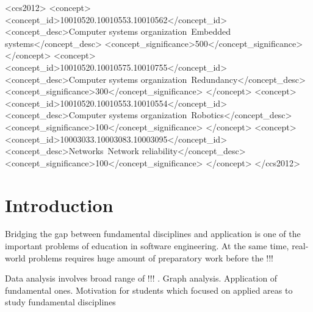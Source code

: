 \documentclass[sigconf]{acmart}
\begin{document}
\begin{CCSXML}
<ccs2012>
 <concept>
  <concept_id>10010520.10010553.10010562</concept_id>
  <concept_desc>Computer systems organization~Embedded systems</concept_desc>
  <concept_significance>500</concept_significance>
 </concept>
 <concept>
  <concept_id>10010520.10010575.10010755</concept_id>
  <concept_desc>Computer systems organization~Redundancy</concept_desc>
  <concept_significance>300</concept_significance>
 </concept>
 <concept>
  <concept_id>10010520.10010553.10010554</concept_id>
  <concept_desc>Computer systems organization~Robotics</concept_desc>
  <concept_significance>100</concept_significance>
 </concept>
 <concept>
  <concept_id>10003033.10003083.10003095</concept_id>
  <concept_desc>Networks~Network reliability</concept_desc>
  <concept_significance>100</concept_significance>
 </concept>
</ccs2012>
\end{CCSXML}




\maketitle

\section{Introduction}

Bridging the gap between fundamental disciplines and application is one of the important problems of education in software engineering. At the same time, real-world problems requires huge amount of preparatory work before the !!!

Data analysis involves broad range of !!! . Graph analysis. Application of fundamental ones. Motivation for students which focused on applied areas to study fundamental disciplines 
\end{document}
